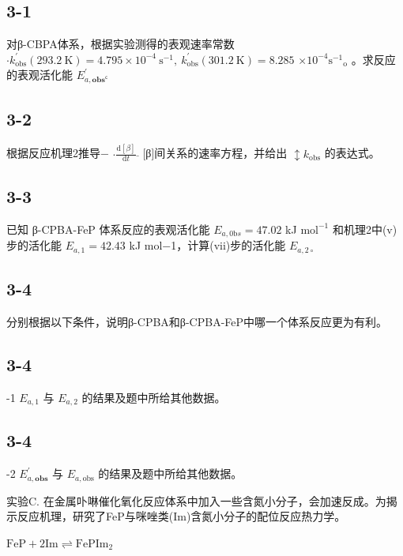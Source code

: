 \subsection*{3-1}
对β-CBPA体系，根据实验测得的表观速率常数 $\cdot k _ { \mathrm { o b s } } ^ { \prime } ( 2 9 3 . 2 ~ \mathrm { K } ) = 4 . 7 9 5 \times 1 0 ^ { - 4 } ~ \mathrm { s } ^ { - 1 } , ~ k _ { \mathrm { o b s } } ^ { \prime } ( 3 0 1 . 2 ~ \mathrm { K } ) = 8 . 2 8 5$ $\times 1 0 ^ { - 4 } \mathrm { { s ^ { - 1 } } _ { \mathrm { { o } } } }$ 。求反应的表观活化能 $E _ { a , \mathbf { o b s } ^ { \mathsf { c } } } ^ { \prime }$

\subsection*{3-2}
根据反应机理2推导− $\cdot \frac { \mathrm { d } [ \beta ] } { \mathrm { d } t } \overset { \_ } { \ }$ [β]间关系的速率⽅程，并给出 $\updownarrow k _ { \mathrm { o b s } }$ 的表达式。

\subsection*{3-3}
已知 β-CPBA-FeP 体系反应的表观活化能 $E _ { a , 0 \mathrm { b } s } = 4 7 . 0 2$ kJ $\mathrm { m o l ^ { - 1 } }$ 和机理2中(v)步的活化能 $E _ { a , 1 } = 4 2 . 4 3$ kJ mol−1，计算(vii)步的活化能 $E _ { a , 2 \circ }$

\subsection*{3-4}
分别根据以下条件，说明β-CPBA和β-CPBA-FeP中哪⼀个体系反应更为有利。

\subsection*{3-4}
-1 $E _ { a , 1 }$ 与 $E _ { a , 2 }$ 的结果及题中所给其他数据。

\subsection*{3-4}
-2 $E _ { a , \mathbf { o b s } } ^ { \prime }$ 与 $E _ { a , \mathrm { o b s } }$ 的结果及题中所给其他数据。

实验C. 在⾦属卟啉催化氧化反应体系中加⼊⼀些含氮⼩分⼦，会加速反成。为揭⽰反应机理，研究了FeP与咪唑类(Im)含氮⼩分⼦的配位反应热⼒学。

$
\mathrm{FeP} + 2 \mathrm{Im} \rightleftharpoons \mathrm{FePIm} _ {2}
$

